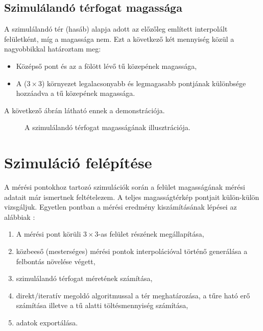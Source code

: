 \subsection{Szimulálandó térfogat magassága}
	A szimulálandó tér (hasáb) alapja adott az előzőleg említett interpolált felületként, míg a
	magassága nem. Ezt a következő két mennyiség közül a nagyobbikkal határoztam meg:
	\begin{itemize}
		\item Középső pont és az a fölött lévő tű közepének magassága,
		\item A ($3\times3$) környezet legalacsonyabb és legmagasabb pontjának
		különbsége hozzáadva a tű közepének magassága.
	\end{itemize}
	A következő ábrán látható ennek a demonstrációja.
	\begin{figure}[ht]
		\hfil
		\caption{
			A szimulálandó térfogat magasságának illusztrációja.
		}
		\label{fig:sim_numh}
	\end{figure}
	
\section{Szimuláció felépítése} \label{sec:sim_felepites}

	A mérési pontokhoz tartozó szimulációk során a felület magasságának mérési adatait már ismertnek feltételezem.
	A teljes magasságtérkép pontjait külön-külön vizsgáljuk.
	Egyetlen pontban a mérési eredmény kiszámításának lépései az alábbiak :
	\begin{enumerate}
		\item A mérési pont körüli $3\times3$-as felület részének megállapítása,
		\item közbeeső (mesterséges) mérési pontok interpolációval történő generálása a felbontás növelése végett,
		\item szimulálandó térfogat méretének számítása,
		\item direkt/iteratív megoldó algoritmussal a tér meghatározása, a tűre ható erő számítása illetve a tű alatti töltésmennyiség
		számítása,
		\item adatok exportálása.
	\end{enumerate}
	

	
